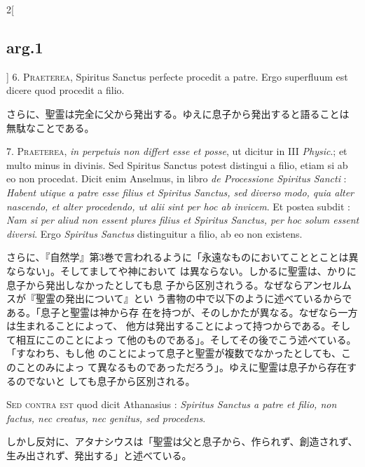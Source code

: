 \documentclass[paper=a4paper,fontsize=10pt,jafontsize=9pt,titlepage]{jlreq}
\begin{document}
\begin{paracol}{2}[\subsection{arg.1}]
6. {\scshape Praeterea},  Spiritus Sanctus perfecte procedit a patre. Ergo
superfluum est dicere quod procedit a filio.

\switchcolumn

さらに、聖霊は完全に父から発出する。ゆえに息子から発出すると語ることは
 無駄なことである。


7. {\scshape Praeterea}, {\itshape in perpetuis non differt esse et posse}, ut dicitur in III
{\itshape Physic}.; et multo minus in divinis. Sed Spiritus Sanctus
potest distingui a filio, etiam si ab eo non procedat. Dicit enim
Anselmus, in libro {\itshape de Processione Spiritus Sancti} : {\itshape Habent utique a
patre esse filius et {\itshape Spiritus Sanctus}, sed diverso modo,
quia alter nascendo, et alter procedendo, ut alii sint per hoc ab
invicem}. Et postea subdit : {\itshape Nam si per aliud non essent plures filius
et Spiritus Sanctus, per hoc solum essent diversi}. Ergo
{\itshape Spiritus Sanctus} distinguitur a filio, ab eo non existens.

\switchcolumn

さらに、『自然学』第3巻で言われるように「永遠なものにおいてこととことは異ならない」。そしてましてや神において
 は異ならない。しかるに聖霊は、かりに息子から発出しなかったとしても息
 子から区別されうる。なぜならアンセルムスが『聖霊の発出について』とい
 う書物の中で以下のように述べているからである。「息子と聖霊は神から存
 在を持つが、そのしかたが異なる。なぜなら一方は生まれることによって、
 他方は発出することによって持つからである。そして相互にこのことによっ
 て他のものである」。そしてその後でこう述べている。「すなわち、もし他
 のことによって息子と聖霊が複数でなかったとしても、このことのみによっ
 て異なるものであっただろう」。ゆえに聖霊は息子から存在するのでないと
 しても息子から区別される。

\switchcolumn*[\subsection{s.c.}]

{\scshape Sed contra est} quod dicit Athanasius : {\itshape Spiritus Sanctus a
patre et filio, non factus, nec creatus, nec genitus, sed procedens}.

\switchcolumn

しかし反対に、アタナシウスは「聖霊は父と息子から、作られず、創造されず、
 生み出されず、発出する」と述べている。


\end{paracol}
\end{document}
